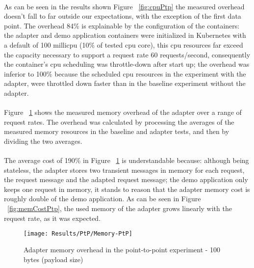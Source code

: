 \paragraph{}

As can be seen in the results shown Figure ~\ref{fig:cpuPtp} the measured overhead doesn't fall to far outside our expectations, with the exception of the first data point.
The overhead 84\% is explainable by the configuration of the containers:
the adapter and demo application containers were initialized in Kubernetes with a default of 100 millicpu (10\% of tested cpu core),
this cpu resources far exceed the capacity necessary to support a request rate 60 requests/second,
consequently the container's cpu scheduling was throttle-down after start up;
the overhead was inferior to 100\% because the scheduled cpu resources in the experiment with the adapter, were throttled down faster than in the baseline experiment without the adapter.

\paragraph{}

Figure ~\ref{fig:memPtp} shows the measured memory overhead of the adapter over a
range of request rates.
The overhead was calculated by processing the averages of the measured memory resources in the baseline and adapter tests, and then by dividing the two averages.

\paragraph{}

The average cost of 190\% in Figure ~\ref{fig:memPtp} is understandable because: although being stateless, the adapter stores two transient messages in memory for each request, the request message and the adapted request message;
the demo application only keeps one request in memory, it stands to reason that the adapter memory cost is roughly double of the demo application.
As can be seen in Figure ~\ref{fig:memCostPtp}, the used memory of the adapter grows linearly with the request rate, as it was expected.

\begin{figure}[htbp]
    \centering
    \texttt{[image: Results/PtP/Memory-PtP]}
    \caption{Adapter memory overhead in the point-to-point experiment - 100 bytes (payload size)}
    \label{fig:memPtp}
\end{figure}

